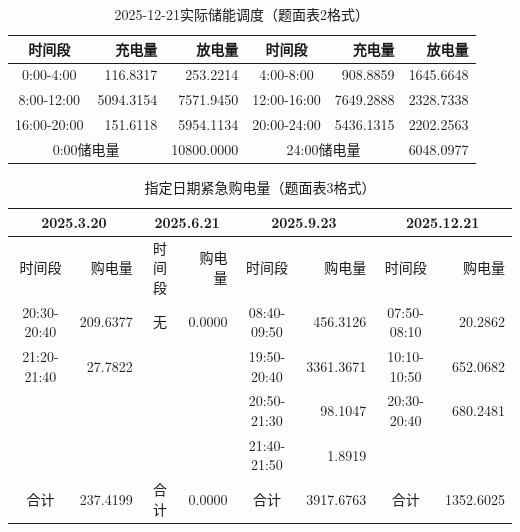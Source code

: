 \begin{table}[htbp]\centering
\caption{2025-12-21实际储能调度（题面表2格式）}
\begin{tabular}{|c|r|r|c|r|r|}\hline
时间段 & 充电量 & 放电量 & 时间段 & 充电量 & 放电量 \\\hline
0:00-4:00 & 116.8317 & 253.2214 & 4:00-8:00 & 908.8859 & 1645.6648 \\\hline
8:00-12:00 & 5094.3154 & 7571.9450 & 12:00-16:00 & 7649.2888 & 2328.7338 \\\hline
16:00-20:00 & 151.6118 & 5954.1134 & 20:00-24:00 & 5436.1315 & 2202.2563 \\\hline
\multicolumn{2}{|c|}{0:00储电量} & 10800.0000 & \multicolumn{2}{c|}{24:00储电量} & 6048.0977 \\\hline
\end{tabular}\end{table}
\begin{table}[htbp]\centering
\caption{指定日期紧急购电量（题面表3格式）}
\small\setlength{\tabcolsep}{3pt}
\begin{tabular}{|c|r|c|r|c|r|c|r|}\hline
\multicolumn{2}{|c|}{2025.3.20} & \multicolumn{2}{c|}{2025.6.21} & \multicolumn{2}{c|}{2025.9.23} & \multicolumn{2}{c|}{2025.12.21} \\\hline
时间段 & 购电量 & 时间段 & 购电量 & 时间段 & 购电量 & 时间段 & 购电量 \\\hline
20:30-20:40 & 209.6377 & 无 & 0.0000 & 08:40-09:50 & 456.3126 & 07:50-08:10 & 20.2862 \\\hline
21:20-21:40 & 27.7822 &  &  & 19:50-20:40 & 3361.3671 & 10:10-10:50 & 652.0682 \\\hline
 &  &  &  & 20:50-21:30 & 98.1047 & 20:30-20:40 & 680.2481 \\\hline
 &  &  &  & 21:40-21:50 & 1.8919 &  &  \\\hline
合计 & 237.4199 & 合计 & 0.0000 & 合计 & 3917.6763 & 合计 & 1352.6025 \\\hline
\end{tabular}\end{table}
